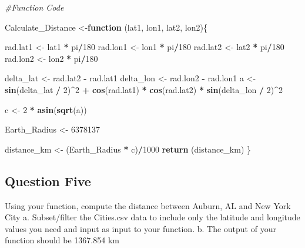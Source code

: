 \documentclass[
  12pt,
]{article}
\newenvironment{Shaded}{\begin{snugshade}}{\end{snugshade}}
\newcommand{\CommentTok}[1]{\textcolor[rgb]{0.56,0.35,0.01}{\textit{#1}}}
\newcommand{\ControlFlowTok}[1]{\textcolor[rgb]{0.13,0.29,0.53}{\textbf{#1}}}
\newcommand{\DecValTok}[1]{\textcolor[rgb]{0.00,0.00,0.81}{#1}}
\newcommand{\FunctionTok}[1]{\textcolor[rgb]{0.13,0.29,0.53}{\textbf{#1}}}
\newcommand{\NormalTok}[1]{#1}
\newcommand{\OtherTok}[1]{\textcolor[rgb]{0.56,0.35,0.01}{#1}}
\newcommand{\SpecialCharTok}[1]{\textcolor[rgb]{0.81,0.36,0.00}{\textbf{#1}}}
\begin{document}
\begin{Shaded}
\begin{Highlighting}[]
\CommentTok{\#Function Code}

\NormalTok{Calculate\_Distance }\OtherTok{\textless{}{-}}\ControlFlowTok{function}\NormalTok{ (lat1, lon1, lat2, lon2)\{}

\NormalTok{rad.lat1 }\OtherTok{\textless{}{-}}\NormalTok{ lat1 }\SpecialCharTok{*}\NormalTok{ pi}\SpecialCharTok{/}\DecValTok{180}
\NormalTok{rad.lon1 }\OtherTok{\textless{}{-}}\NormalTok{ lon1 }\SpecialCharTok{*}\NormalTok{ pi}\SpecialCharTok{/}\DecValTok{180}
\NormalTok{rad.lat2 }\OtherTok{\textless{}{-}}\NormalTok{ lat2 }\SpecialCharTok{*}\NormalTok{ pi}\SpecialCharTok{/}\DecValTok{180}
\NormalTok{rad.lon2 }\OtherTok{\textless{}{-}}\NormalTok{ lon2 }\SpecialCharTok{*}\NormalTok{ pi}\SpecialCharTok{/}\DecValTok{180}

\NormalTok{delta\_lat }\OtherTok{\textless{}{-}}\NormalTok{ rad.lat2 }\SpecialCharTok{{-}}\NormalTok{ rad.lat1}
\NormalTok{delta\_lon }\OtherTok{\textless{}{-}}\NormalTok{ rad.lon2 }\SpecialCharTok{{-}}\NormalTok{ rad.lon1}
\NormalTok{a }\OtherTok{\textless{}{-}} \FunctionTok{sin}\NormalTok{(delta\_lat }\SpecialCharTok{/} \DecValTok{2}\NormalTok{)}\SpecialCharTok{\^{}}\DecValTok{2} \SpecialCharTok{+} \FunctionTok{cos}\NormalTok{(rad.lat1) }\SpecialCharTok{*} \FunctionTok{cos}\NormalTok{(rad.lat2) }\SpecialCharTok{*} \FunctionTok{sin}\NormalTok{(delta\_lon }\SpecialCharTok{/} \DecValTok{2}\NormalTok{)}\SpecialCharTok{\^{}}\DecValTok{2}

\NormalTok{c }\OtherTok{\textless{}{-}} \DecValTok{2} \SpecialCharTok{*} \FunctionTok{asin}\NormalTok{(}\FunctionTok{sqrt}\NormalTok{(a)) }

\NormalTok{Earth\_Radius }\OtherTok{\textless{}{-}} \DecValTok{6378137}

\NormalTok{distance\_km }\OtherTok{\textless{}{-}}\NormalTok{ (Earth\_Radius }\SpecialCharTok{*}\NormalTok{ c)}\SpecialCharTok{/}\DecValTok{1000}
\FunctionTok{return}\NormalTok{ (distance\_km)}
\NormalTok{\}}
\end{Highlighting}
\end{Shaded}

\subsection{Question Five}\label{question-five}

Using your function, compute the distance between Auburn, AL and New
York City a. Subset/filter the Cities.csv data to include only the
latitude and longitude values you need and input as input to your
function. b. The output of your function should be 1367.854 km
\end{document}
